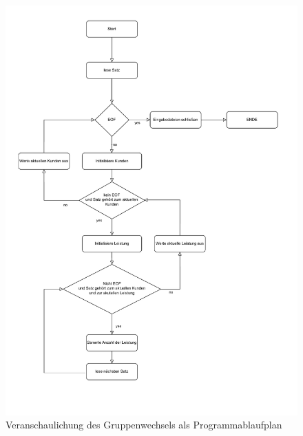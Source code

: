 \begin{figure}[!h]
    \centering
    \includegraphics[scale=0.9,width=\textwidth,height=\textheight,keepaspectratio]{images/Gruppenwechsel-PAP.pdf}
    \caption{
        Veranschaulichung des Gruppenwechsels als Programmablaufplan
    }
    \label{fig:diagramm1}
\end{figure}

